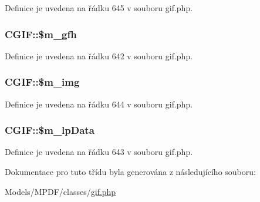 Definice je uvedena na řádku 645 v souboru gif.\-php.

\hypertarget{class_c_g_i_f_a37789fe6352faed5835a30867f6b1cb9}{
\subsubsection[{\$m\-\_\-gfh}]{\setlength{\rightskip}{0pt plus 5cm}C\-G\-I\-F\-::\$m\-\_\-gfh}}\label{class_c_g_i_f_a37789fe6352faed5835a30867f6b1cb9}


Definice je uvedena na řádku 642 v souboru gif.\-php.

\hypertarget{class_c_g_i_f_a6f891b4cc8941f58ad1aefcf8f917703}{
\subsubsection[{\$m\-\_\-img}]{\setlength{\rightskip}{0pt plus 5cm}C\-G\-I\-F\-::\$m\-\_\-img}}\label{class_c_g_i_f_a6f891b4cc8941f58ad1aefcf8f917703}


Definice je uvedena na řádku 644 v souboru gif.\-php.

\hypertarget{class_c_g_i_f_ab7a08543a61c467fb257ac8967a1a90b}{
\subsubsection[{\$m\-\_\-lp\-Data}]{\setlength{\rightskip}{0pt plus 5cm}C\-G\-I\-F\-::\$m\-\_\-lp\-Data}}\label{class_c_g_i_f_ab7a08543a61c467fb257ac8967a1a90b}


Definice je uvedena na řádku 643 v souboru gif.\-php.



Dokumentace pro tuto třídu byla generována z následujícího souboru\-:\begin{DoxyCompactItemize}
\item 
Models/\-M\-P\-D\-F/classes/\hyperlink{gif_8php}{gif.\-php}\end{DoxyCompactItemize}
